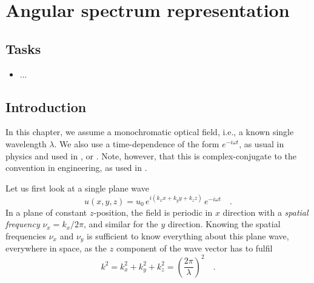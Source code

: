 \renewcommand{\lastmod}{January 13, 2022}
\renewcommand{\chapterauthors}{Markus Lippitz}


\chapter{Angular spectrum representation}

\section{Tasks}

\begin{itemize}
\item ...
\end{itemize}




\section{Introduction}

In this chapter, we assume a monochromatic optical field, i.e., a known single wavelength $\lambda$. We also use  a time-dependence of the form $e^{-i \omega t}$, as usual in physics and used in \cite{Novotny-Hecht2012}, or \cite{Goodman2005}. Note, however, that this is complex-conjugate to the convention in engineering, as used in \cite{SalehTeich1991}.

Let us first look at a single plane wave
\begin{equation}
    u(x,y,z) = u_0 \, e^{i (k_x x + k_y y + k_z z)} \, e^{-i \omega t} \quad .
\end{equation}
In a plane of constant $z$-position, the field is periodic in $x$ direction with a \emph{spatial frequency} $\nu_x = k_x / 2 \pi$, and similar for the $y$ direction. Knowing the spatial frequencies $\nu_x$ and $\nu_y$ is sufficient to know everything about this plane wave, everywhere in space, as the $z$ component of the wave vector has to fulfil 
\begin{equation}
    k^2 = k_x^2 + k_y^2 + k_z^2 = \left( \frac{2\pi}{\lambda} \right)^2 \quad .
    \label{eq:micros_ksq}
\end{equation}

